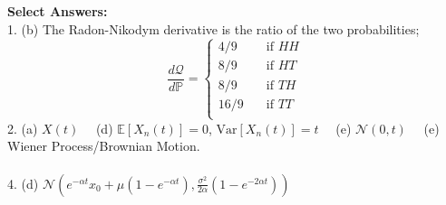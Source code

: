 \documentclass[11pt]{article}
\newcommand{\PR}{\mathbb{P}}
\begin{document}
	\textbf{Select Answers:}\\
	1. (b) The Radon-Nikodym derivative is the ratio of the two probabilities;
	\[	\frac{d\mathcal{Q}}{d\PR} = \begin{cases}
										4/9 & \quad \text{if }HH\\
										8/9 & \quad \text{if }HT\\
										8/9 & \quad \text{if }TH\\
										16/9 & \quad \text{if }TT\\
										\end{cases}
			\] 
	2. (a) $X(t)\quad$ (d) $\mathbb{E}[X_{n}(t)] = 0$, $\text{Var}[X_{n}(t)] = t\quad$ (e) $\mathcal{N}(0,t)\quad$ (e) Wiener Process/Brownian Motion.\\\\
	4. (d) $\mathcal{N}\left(e^{-\alpha t}x_{0} + \mu(1 - e^{-\alpha t}), \frac{\sigma^{2}}{2\alpha}(1 - e^{-2\alpha t})\right)$
	
\end{document}
